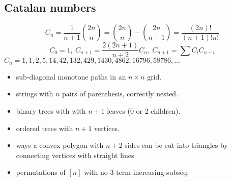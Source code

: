 \subsection{Catalan numbers}
\[ C_n=\frac{1}{n+1}\binom{2n}{n}= \binom{2n}{n}-\binom{2n}{n+1} = \frac{(2n)!}{(n+1)!n!} \]
\[ C_0=1,\ C_{n+1} = \frac{2(2n+1)}{n+2}C_n,\ C_{n+1}=\sum C_iC_{n-i} \]
${C_n = 1, 1, 2, 5, 14, 42, 132, 429, 1430, 4862, 16796, 58786, \dots}$
\begin{itemize}
   \item sub-diagonal monotone paths in an $n\times n$ grid.
   \item strings with $n$ pairs of parenthesis, correctly nested.
   \item binary trees with with $n+1$ leaves (0 or 2 children).
   \item ordered trees with $n+1$ vertices.
   \item ways a convex polygon with $n+2$ sides can be cut into triangles by connecting
         vertices with straight lines.
   \item permutations of $[n]$ with no 3-term increasing subseq.
\end{itemize}